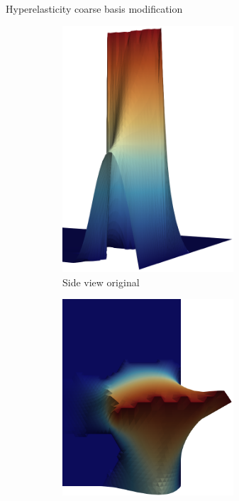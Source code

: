 \begin{frame}[noframenumbering]{Hyperelasticity coarse basis modification}
	\begin{figure}[h!]
		\begin{subfigure}{0.49\textwidth}
			\centering
			\includegraphics[width=0.7\textwidth,height=0.33\textheight]{images/beam-coarse-basis-1.png}
			\caption{\hspace{-20mm}Side view original}
		\end{subfigure}
		\hfill
		\begin{subfigure}{0.49\textwidth}
			\centering
			\includegraphics[width=0.7\textwidth,height=0.33\textheight]{images/beam-coarse-basis-2.png}

\end{subfigure}
\end{figure}
\end{frame}

